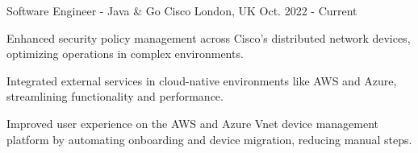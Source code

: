 

\begin{cventries}


\cventry
    {Software Engineer - Java \& Go} %
    {Cisco} %
    {London, UK} %
    {Oct. 2022 - Current} %
    {
      \begin{cvitems}
        \item {Enhanced security policy management across Cisco's distributed network devices, optimizing operations in complex environments.}
        \item {Integrated external services in cloud-native environments like AWS and Azure, streamlining functionality and performance.}
        \item {Improved user experience on the AWS and Azure Vnet device management platform by automating onboarding and device migration, reducing manual steps.}

\end{cvitems}}
\end{cventries}
